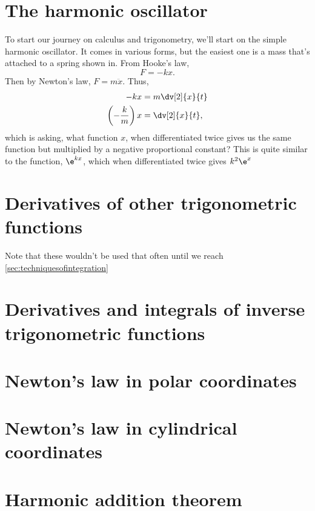 \section{The harmonic oscillator}

To start our journey on calculus and trigonometry, we'll start on the simple harmonic oscillator. It comes in various forms, but the easiest one is a mass that's attached to a spring shown in. From Hooke's law,
\begin{equation}
    F = -kx.
\end{equation}
Then by Newton's law, $F = m\ddot{x}$. Thus,
\begin{align}
    -kx &= m\dv[2]{x}{t} \\
    \left(-\frac{k}{m}\right)x &= \dv[2]{x}{t},
\end{align}
which is asking, what function $x$, when differentiated twice gives us the same function but multiplied by a negative proportional constant? This is quite similar to the function, $\e^{kx}$, which when differentiated twice gives $k^2\e^x$

\section{Derivatives of other trigonometric functions}

Note that these wouldn't be used that often until we reach \cref{sec:techniquesofintegration}

\section{Derivatives and integrals of inverse trigonometric functions}

\section{Newton's law in polar coordinates}

\section{Newton's law in cylindrical coordinates}

\section{Harmonic addition theorem}

